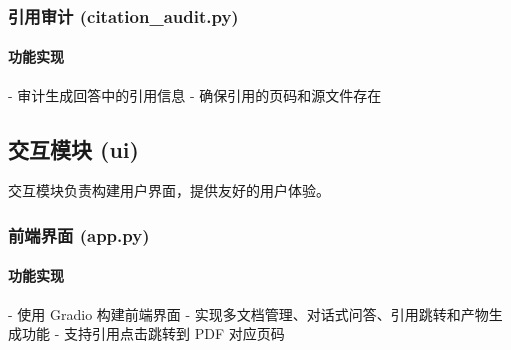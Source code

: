 \subsubsection{引用审计 (citation_audit.py)}

\paragraph{功能实现}
- 审计生成回答中的引用信息
- 确保引用的页码和源文件存在

\subsection{交互模块 (ui)}

交互模块负责构建用户界面，提供友好的用户体验。

\subsubsection{前端界面 (app.py)}

\paragraph{功能实现}
- 使用 Gradio 构建前端界面
- 实现多文档管理、对话式问答、引用跳转和产物生成功能
- 支持引用点击跳转到 PDF 对应页码
